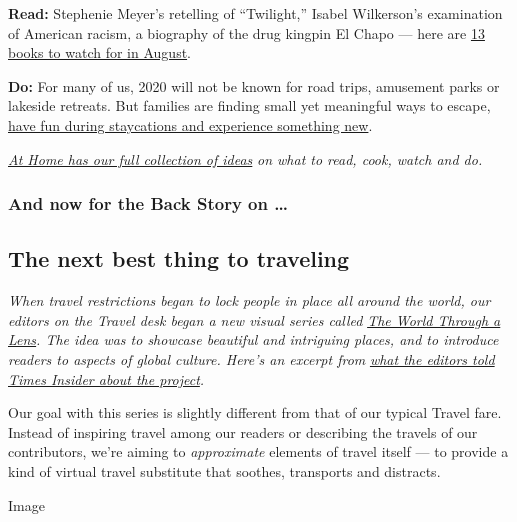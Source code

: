 \textbf{Read:} Stephenie Meyer's retelling of ``Twilight,'' Isabel
Wilkerson's examination of American racism, a biography of the drug
kingpin El Chapo --- here are
\href{https://www.nytimes.com/2020/07/30/books/new-august-books.html?action=click\&module=RelatedLinks\&pgtype=collection}{13
books to watch for in August}.

\textbf{Do:} For many of us, 2020 will not be known for road trips,
amusement parks or lakeside retreats. But families are finding small yet
meaningful ways to escape,
\href{https://www.nytimes.com/2020/07/24/parenting/summer-staycation-coronavirus.html?action=click\&module=RelatedLinks\&pgtype=collection}{have
fun during staycations and experience something new}.

\href{https://www.nytimes.com/spotlight/at-home}{\emph{At Home has our
full collection of ideas}} \emph{on what to read, cook, watch and do.}

\hypertarget{and-now-for-the-back-story-on-}{%
\subsubsection{And now for the Back Story on
\ldots{}}\label{and-now-for-the-back-story-on-}}

\hypertarget{the-next-best-thing-to-traveling}{%
\subsection{The next best thing to
traveling}\label{the-next-best-thing-to-traveling}}

\emph{When travel restrictions began to lock people in place all around
the world, our editors on the Travel desk began a new visual series
called}
\href{https://www.nytimes.com/column/the-world-through-a-lens}{\emph{The
World Through a Lens}}\emph{. The idea was to showcase beautiful and
intriguing places, and to introduce readers to aspects of global
culture. Here's an excerpt from}
\href{https://www.nytimes.com/2020/08/03/insider/letting-their-cameras-transport-you.html}{\emph{what
the editors told Times Insider about the project}}\emph{.}

Our goal with this series is slightly different from that of our typical
Travel fare. Instead of inspiring travel among our readers or describing
the travels of our contributors, we're aiming to \emph{approximate}
elements of travel itself --- to provide a kind of virtual travel
substitute that soothes, transports and distracts.

Image

